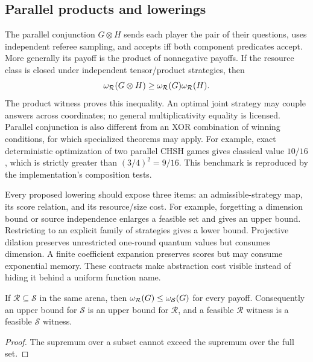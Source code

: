 \subsection{Parallel products and lowerings}
The parallel conjunction $G\otimes H$ sends each player the pair of their
questions, uses independent referee sampling, and accepts iff both component
predicates accept. More generally its payoff is the product of nonnegative
payoffs. If the resource class is closed under independent tensor/product
strategies, then
\[
 \omega_{\mathcal R}(G\otimes H)\geq
 \omega_{\mathcal R}(G)\omega_{\mathcal R}(H).
\]
The product witness proves this inequality. An optimal joint strategy may
couple answers across coordinates; no general multiplicativity equality is
licensed. Parallel conjunction is also different from an XOR combination of
winning conditions, for which specialized theorems may apply.
For example, exact deterministic optimization of two parallel CHSH games
gives classical value $10/16$, which is strictly greater than
$(3/4)^2=9/16$. This benchmark is reproduced by the implementation's
composition tests.

Every proposed lowering should expose three items: an admissible-strategy
map, its score relation, and its resource/size cost. For example, forgetting a
dimension bound or source independence enlarges a feasible set and gives an
upper bound. Restricting to an explicit family of strategies gives a lower
bound. Projective dilation preserves unrestricted one-round quantum values
but consumes dimension. A finite coefficient expansion preserves scores but
may consume exponential memory. These contracts make abstraction cost
visible instead of hiding it behind a uniform function name.

\begin{proposition}
If $\mathcal R\subseteq\mathcal S$ in the same arena, then
$\omega_{\mathcal R}(G)\leq\omega_{\mathcal S}(G)$ for every payoff.
Consequently an upper bound for $\mathcal S$ is an upper bound for
$\mathcal R$, and a feasible $\mathcal R$ witness is a feasible
$\mathcal S$ witness.
\end{proposition}
\begin{proof}
The supremum over a subset cannot exceed the supremum over the full set.
\end{proof}
